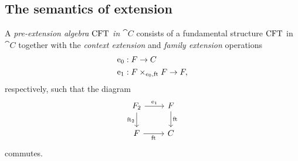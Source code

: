 \subsection{The semantics of extension}
\begin{defn}
A \emph{pre-extension algebra $\mathrm{CFT}$ in $\cat{C}$} consists of a fundamental structure
$\mathrm{CFT}$
in $\cat{C}$ together with the \emph{context extension} and \emph{family extension} operations
\begin{align*}
\ectxext &:\stesysf\to \stesysc\\
\efamext & :\stesysff\to \stesysf,
\end{align*}
respectively, such that the diagram
\begin{equation*}
\begin{tikzcd}
\stesysf_2 
  \ar{r}{\efamext} 
  \ar{d}[swap]{\eft[2]} 
  & 
\stesysf 
  \ar{d}{\eft}
  \\
\stesysf
  \ar{r}[swap]{\eft} 
  & 
\stesysc
\end{tikzcd}
\end{equation*}
commutes.
\end{defn}

